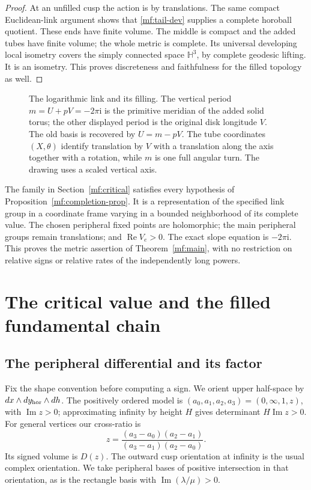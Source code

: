 \documentclass[11pt]{article}
\numberwithin{equation}{section}
\theoremstyle{definition}
\theoremstyle{remark}
\newcommand{\ii}{\mathrm i}
\newcommand{\Rea}{\operatorname{Re}}
\newcommand{\Ima}{\operatorname{Im}}
\begin{document}
\begin{proof}
At an unfilled cusp the action is by translations. The same compact
Euclidean-link argument shows that \eqref{mf:tail-dev} supplies a
complete horoball quotient. These ends have finite volume.
The middle is compact and the added tubes have finite volume;
the whole metric is complete. Its universal developing local
isometry covers the simply connected space \(\mathbb H^3\), by
complete geodesic lifting. It is an isometry. This proves discreteness
and faithfulness for the filled topology as well.
\end{proof}

\begin{figure}[tb]
\centering

\caption{The logarithmic link and its filling. The vertical period
\(m=U+pV=-2\pi\ii\) is the primitive meridian of the added solid torus;
the other displayed period is the original disk longitude \(V\).
The old basis is recovered by \(U=m-pV\). The tube coordinates
\((X,\theta)\) identify translation by \(V\) with a translation along
the axis together with a rotation, while \(m\) is one full angular
turn. The drawing uses a scaled vertical axis.}
\label{mf:filling-figure}
\end{figure}

The family in Section~\ref{mf:critical} satisfies every hypothesis
of Proposition~\ref{mf:completion-prop}. It is a representation of
the specified link group in a coordinate frame varying in a bounded
neighborhood of its complete value. The chosen peripheral fixed
points are holomorphic;
the main peripheral groups remain translations; and
\(\Rea V_e>0\). The exact slope equation is \(-2\pi\ii\).
This proves the metric assertion of Theorem~\ref{mf:main}, with
no restriction on relative signs or relative rates of the
independently long powers.

\section{The critical value and the filled fundamental chain}
\label{mf:regulator}

\subsection{The peripheral differential and its factor}

Fix the shape convention before computing a sign. We orient
upper half-space by \(dx\wedge dy_{\rm hor}\wedge dh\).
The positively ordered model is
\((a_0,a_1,a_2,a_3)=(0,\infty,1,z)\), with \(\Ima z>0\);
approximating infinity by height \(H\) gives determinant
\(H\Ima z>0\). For general vertices our cross-ratio is
\[
 z=\frac{(a_3-a_0)(a_2-a_1)}
          {(a_3-a_1)(a_2-a_0)}.
\]
Its signed volume is \(D(z)\). The outward cusp orientation at
infinity is the usual complex orientation. We take peripheral
bases of positive intersection in that orientation, as is the
rectangle basis with \(\Ima(\lambda/\mu)>0\).
\end{document}
